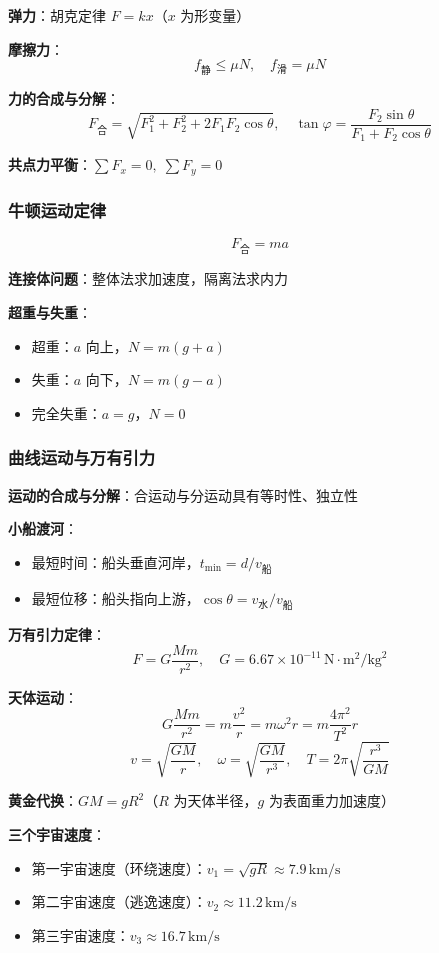 \textbf{弹力}：胡克定律 $F = kx$（$x$ 为形变量）

\textbf{摩擦力}：
\[
f_{\text{静}} \le \mu N,\quad
f_{\text{滑}} = \mu N
\]

\textbf{力的合成与分解}：
\[
F_{\text{合}} = \sqrt{F_1^2+F_2^2+2F_1F_2\cos\theta},\quad
\tan\varphi = \frac{F_2\sin\theta}{F_1+F_2\cos\theta}
\]

\textbf{共点力平衡}：$\sum F_x = 0,\;\sum F_y = 0$

\subsubsection{牛顿运动定律}

\[
F_{\text{合}} = ma
\]

\textbf{连接体问题}：整体法求加速度，隔离法求内力

\textbf{超重与失重}：
\begin{itemize}
  \item 超重：$a$ 向上，$N = m(g+a)$
  \item 失重：$a$ 向下，$N = m(g-a)$
  \item 完全失重：$a=g$，$N=0$
\end{itemize}

\subsubsection{曲线运动与万有引力}

\textbf{运动的合成与分解}：合运动与分运动具有等时性、独立性

\textbf{小船渡河}：
\begin{itemize}
  \item 最短时间：船头垂直河岸，$t_{\min}=d/v_{\text{船}}$
  \item 最短位移：船头指向上游，$\cos\theta = v_{\text{水}}/v_{\text{船}}$
\end{itemize}

\textbf{万有引力定律}：
\[
F = G\frac{Mm}{r^2},\quad G = 6.67\times10^{-11}\,\text{N}\cdot\text{m}^2/\text{kg}^2
\]

\textbf{天体运动}：
\[
G\frac{Mm}{r^2} = m\frac{v^2}{r} = m\omega^2 r = m\frac{4\pi^2}{T^2}r
\]
\[
v = \sqrt{\frac{GM}{r}},\quad
\omega = \sqrt{\frac{GM}{r^3}},\quad
T = 2\pi\sqrt{\frac{r^3}{GM}}
\]

\textbf{黄金代换}：$GM = gR^2$（$R$ 为天体半径，$g$ 为表面重力加速度）

\textbf{三个宇宙速度}：
\begin{itemize}
  \item 第一宇宙速度（环绕速度）：$v_1 = \sqrt{gR} \approx 7.9\,\text{km/s}$
  \item 第二宇宙速度（逃逸速度）：$v_2 \approx 11.2\,\text{km/s}$
  \item 第三宇宙速度：$v_3 \approx 16.7\,\text{km/s}$
\end{itemize}

